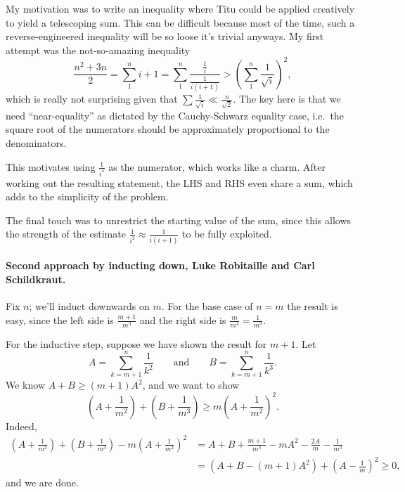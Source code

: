 \documentclass[11pt]{scrartcl}
\begin{document}
\begin{remark*}
  My motivation was to write an inequality where
  Titu could be applied creatively to yield a telescoping sum.
  This can be difficult because most of the time,
  such a reverse-engineered inequality will be so loose it's trivial anyways.
  My first attempt was the not-so-amazing inequality
  \[\frac{n^2+3n}2=\sum_1^n i+1=\sum_1^n \frac{\frac1i}{\frac1{i(i+1)}}
    >\left( \sum_1^n \frac1{\sqrt i} \right)^2,\]
  which is really not surprising given that
  $\sum\frac1{\sqrt i}\ll \frac n{\sqrt2}$.
  The key here is that we need ``near-equality''
  as dictated by the Cauchy-Schwarz equality case,
  i.e.\ the square root of the numerators should be
  approximately proportional to the denominators.

  This motivates using $\frac1{i^4}$ as the numerator,
  which works like a charm. After working out the resulting statement,
  the LHS and RHS even share a sum,
  which adds to the simplicity of the problem.

  The final touch was to unrestrict the starting value of the sum,
  since this allows the strength of the estimate
  $\frac1{i^2}\approx\frac1{i(i+1)}$ to be fully exploited.
\end{remark*}

\paragraph{Second approach by inducting down, Luke Robitaille and Carl Schildkraut.}
Fix $n$; we'll induct downwards on $m$.
For the base case of $n=m$ the result is easy,
since the left side is $\frac{m+1}{m^3}$ and the right side is $\frac m{m^4}=\frac1{m^3}$.

For the inductive step, suppose we have shown the result for $m+1$.
Let
\[A=\sum_{k=m+1}^n\frac1{k^2}\qquad \text{and}\qquad B=\sum_{k=m+1}^n\frac1{k^3}.\]
We know $A+B\geq (m+1)A^2$, and we want to show
\[\left(A+\frac1{m^2}\right)+\left(B+\frac1{m^3}\right)\geq m\left(A+\frac1{m^2}\right)^2.\]
Indeed,
\begin{align*}
  \left(A+\frac1{m^2}\right)+\left(B+\frac1{m^3}\right)-m\left(A+\frac1{m^2}\right)^2
  &=A+B+\frac{m+1}{m^3}-mA^2-\frac{2A}m-\frac1{m^3}\\
  &=\left(A+B-(m+1)A^2\right)+\left(A-\frac1m\right)^2\geq 0,
\end{align*}
and we are done.
\end{document}
